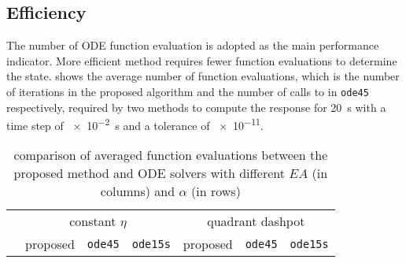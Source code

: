 \subsection{Efficiency}
The number of ODE function evaluation is adopted as the main performance indicator. More efficient method requires fewer function evaluations to determine the state.  shows the average number of function evaluations, which is the number of iterations in the proposed algorithm and the number of calls to  in \texttt{ode45} respectively, required by two methods to compute the response for \SI{20}{\second} with a time step of \SI{e-2}{\second} and a tolerance of \num[print-unity-mantissa=false]{e-11}.
\begin{table}[ht]
\centering\scriptsize\setlength{\tabcolsep}{3pt}
\caption{comparison of averaged function evaluations between the proposed method and ODE solvers with different $EA$ (in columns) and $\alpha$ (in rows)}\label{tab:func_eval}
\begin{tabular}{rrrr|rrr|rrr|rrr|rrr|rrr}
    \toprule
                             &                                                                                                                                                             \multicolumn{9}{c|}{constant $\eta$}                                                                                                                                                             &                                                                                                                                                             \multicolumn{9}{c}{quadrant dashpot}                                                                                                                                                             \\
                             &                                           \multicolumn{3}{c|}{proposed}                                            &                                        \multicolumn{3}{c|}{\texttt{ode45}}                                         &                                        \multicolumn{3}{c|}{\texttt{ode15s}}                                        &                                           \multicolumn{3}{c|}{proposed}                                            &                                         \multicolumn{3}{c|}{\texttt{ode45}}                                         &                                        \multicolumn{3}{c}{\texttt{ode15s}}                                         \\ \midrule

\end{tabular}
\end{table}
